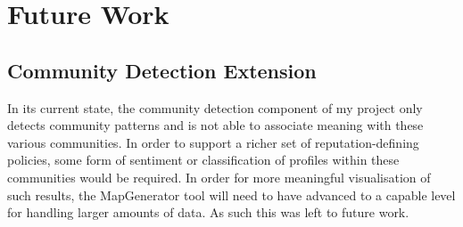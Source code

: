 





\section{Future Work}

\subsection{Community Detection Extension}

In its current state, the community detection component of my project only detects community patterns and is not able to associate meaning with these various communities. In order to support a richer set of reputation-defining policies, some form of sentiment or classification of profiles within these communities would be required. In order for more meaningful visualisation of such results, the MapGenerator tool will need to have advanced to a capable level for handling larger amounts of data. As such this was left to future work.

